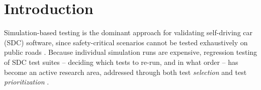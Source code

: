 \documentclass[smallextended]{svjour3}
\begin{document}
\begin{abstract}
(more training, stratified sampling, a Transformer backbone, a listwise
ranking loss) each produced
a real, measurable decrease relative to the proposed model, not merely a
null result.
\textbf{Conclusions.} Classification accuracy is an unreliable indicator of
prioritization effectiveness for ML-based SDC test prioritizers; the
mismatch is large, measurable, and repairable with a ranking-aware training
objective, but aggregate improvement can obscure small, statistically
consistent subgroup-level regressions that prior evaluations of this class
of tool do not examine.
\end{abstract}

\section{Introduction}
\label{sec:intro}

Simulation-based testing is the dominant approach for validating
self-driving car (SDC) software, since safety-critical scenarios cannot be
tested exhaustively on public roads \citep{sun2021scenario,ploeg2021scenario}.
Because individual simulation runs are expensive, regression testing of SDC
test suites -- deciding which tests to re-run, and in what order -- has
become an active research area, addressed through both test
\emph{selection} \citep{birchler2022cost,birchler2023machine} and test
\emph{prioritization} \citep{birchler2023single}.
\end{document}
